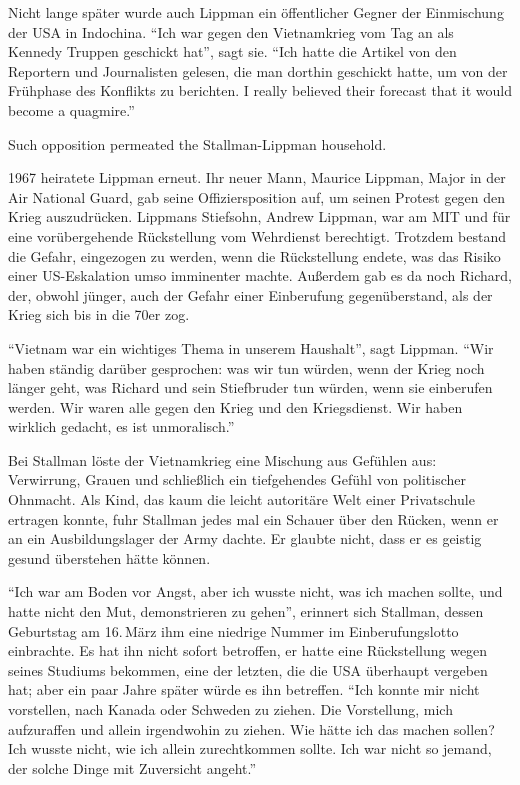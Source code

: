 {Nicht lange später wurde auch Lippman ein öffentlicher Gegner der Einmischung der USA in Indochina. "`Ich war gegen den Vietnamkrieg vom Tag an als Kennedy Truppen geschickt hat"', sagt sie. "`Ich hatte die Artikel von den Reportern und Journalisten gelesen, die man dorthin geschickt hatte, um von der Frühphase des Konflikts zu berichten. I really believed their forecast that it would become a quagmire."'

Such opposition permeated the Stallman-Lippman household.} 1967 heiratete Lippman erneut. Ihr neuer Mann, Maurice Lippman, Major in der Air National Guard, gab seine Offiziersposition auf, um seinen Protest gegen den Krieg auszudrücken. Lippmans Stiefsohn, Andrew Lippman, war am MIT und für eine vorübergehende Rückstellung vom Wehrdienst berechtigt. Trotzdem bestand die Gefahr, eingezogen zu werden, wenn die Rückstellung endete, was das Risiko einer US-Eskalation umso imminenter machte. Außerdem gab es da noch Richard, der, obwohl jünger, auch der Gefahr einer Einberufung gegenüberstand, als der Krieg sich bis in die 70er zog.

"`Vietnam war ein wichtiges Thema in unserem Haushalt"', sagt Lippman. "`Wir haben ständig darüber gesprochen: was wir tun würden, wenn der Krieg noch länger geht, was Richard und sein Stiefbruder tun würden, wenn sie einberufen werden. Wir waren alle gegen den Krieg und den Kriegsdienst. Wir haben wirklich gedacht, es ist unmoralisch."'

Bei Stallman löste der Vietnamkrieg eine Mischung aus Gefühlen aus: Verwirrung, Grauen und schließlich ein tiefgehendes Gefühl von politischer Ohnmacht. Als Kind, das kaum die leicht autoritäre Welt einer Privatschule ertragen konnte, fuhr Stallman jedes mal ein Schauer über den Rücken, wenn er an ein Ausbildungslager der Army dachte. Er glaubte nicht, dass er es geistig gesund überstehen hätte können.

"`Ich war am Boden vor Angst, aber ich wusste nicht, was ich machen sollte, und hatte nicht den Mut, demonstrieren zu gehen"', erinnert sich Stallman, dessen Geburtstag am 16.\,März ihm eine niedrige Nummer im Einberufungslotto einbrachte. Es hat ihn nicht sofort betroffen, er hatte eine Rückstellung wegen seines Studiums bekommen, eine der letzten, die die USA überhaupt vergeben hat; aber ein paar Jahre später würde es ihn betreffen. "`Ich konnte mir nicht vorstellen, nach Kanada oder Schweden zu ziehen. Die Vorstellung, mich aufzuraffen und allein irgendwohin zu ziehen. Wie hätte ich das machen sollen? Ich wusste nicht, wie ich allein zurechtkommen sollte. Ich war nicht so jemand, der solche Dinge mit Zuversicht angeht."'

